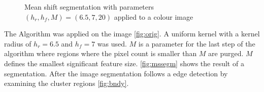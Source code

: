 \begin{figure}[ht]
  \centering {}%

  \caption{Mean shift segmentation with parameters $(h_r, h_f, M) =
    (6.5, 7, 20)$ applied to a colour image}
  \label{fig:mssegm}
\end{figure}


The Algorithm was applied on the image \autoref{fig:orig}. A uniform
kernel with a kernel radius of $h_r = 6.5$ and $h_f = 7$ was used. $M$
is a parameter for the last step of the algorithm where regions where
the pixel count is smaller than $M$ are purged. $M$ defines the
smallest significant feature size.  \autoref{fig:mssegm} shows the
result of a segmentation. After the image segmentation follows a edge
detection by examining the cluster regions \autoref{fig:bndy}.


